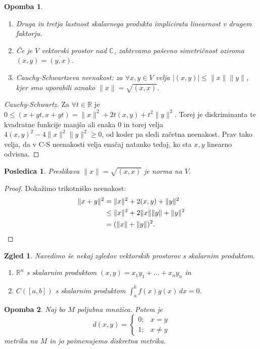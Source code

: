 \documentclass[10pt, a4paper]{article}
\newtheorem{posledica}[izr]{Posledica}
\newtheorem*{opomba}{Opomba}
\newtheorem{zgled}[izr]{Zgled}
\newenvironment{noticeC}{%
  \tcolorbox[%
  notitle,
  empty,
  enhanced,  %
  breakable,
  coltext=black, 
  fontupper=\rmfamily,
  noparskip,
  sharp corners,
  boxrule=-1pt,  %
  frame hidden,
  left=7pt,  %
  right=7pt,
  top=5pt,
  bottom=5pt,
  before skip=2.5ex plus 2pt,
  after skip=2.5ex plus 2pt,
  overlay unbroken and last={%
  },
  ]}
{\endtcolorbox}
\newenvironment{dokaz}%
  {\begin{noticeC}\begin{proof}}%
  {\end{proof}\end{noticeC}}
\newcommand{\R}{\mathbb {R}}
\newcommand{\C}{\mathbb {C}}
\begin{document}
\begin{opomba}
    \begin{enumerate}
        \item Druga in tretja lastnost skalarnega produkta implicirata linearnost v drugem faktorju.
        \item Če je $V$ vektorski prostor nad $\C$, zahtevamo poševno simetričnost oziroma $(x,y) = \overline{(y,x)}$.
        \item Cauchy-Schwartzeva neenakost: za $\forall x,y \in V$ velja $|(x,y)| \leq \|x\| \|y\|$, kjer smo uporabili oznako $\|x\| = \sqrt{(x,x)}$.
    \end{enumerate}
\end{opomba}

\begin{dokaz}[Cauchy-Schwartz]
    Za $\forall t \in \R$ je $0 \leq (x + yt, x+ yt) = \|x\|^2 + 2t(x,y) + t^2 \|y\|^2$.
    Torej je diskriminanta te kvadratne funkcije manjša ali enaka $0$ in torej velja $4 (x,y)^2 - 4\|x\|^2 \|y\|^2 \geq 0$, od koder pa sledi začetna neenakost.
    Prav tako velja, da v C-S neenakosti velja enačaj natanko tedaj, ko sta $x,y$ linearno odvisna.
\end{dokaz}

\begin{posledica}
    Preslikava $\|x\| = \sqrt{(x,x)}$ je norma na $V$.
\end{posledica}

\begin{dokaz}
    Dokažimo trikotniško neenakost: 
    \begin{align*}
        \|x+y\|^2 &= \|x\|^2 + 2(x,y) + \|y\|^2\\
        &\leq \|x\|^2 + 2\|x\| \|y\| + \|y\|^2\\
        &= (\|x\| + \|y\|)^2. \qedhere
    \end{align*}
\end{dokaz}

\begin{zgled}
    Navedimo še nekaj zgledov vektorskih prostorov s skalarnim produktom.
    \begin{enumerate}
        \item $\R^n$ s skalarnim produktom $(x,y) = x_1 y_1 + \dots + x_n y_n$ in
        \item $C([a, b])$ s skalarnim produktom $\int_a ^b f(x)g(x)\,dx = 0$.
    \end{enumerate}
\end{zgled}

\begin{opomba}
    Naj bo $M$ poljubna množica. Potem je $$d(x,y) = \begin{cases}
        0; & x = y\\
        1; & x \neq y
    \end{cases}$$ metrika na $M$ in jo poimenujemo diskretna metrika.
\end{opomba}
\end{document}
